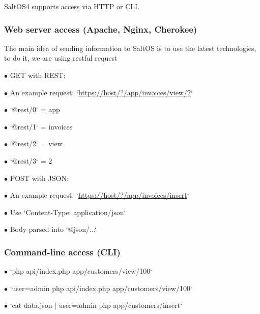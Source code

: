 \documentclass[a4paper]{article}
\def\htmladdnormallink#1#2{\href{#2}{#1}}
\begin{document}
SaltOS4 supports access via HTTP or CLI.

\hypertarget{toc13}{}
\subsubsection{Web server access (Apache, Nginx, Cherokee)}

The main idea of sending information to SaltOS is to use the latest technologies, to do it, we are using restful request

\begin{compactitem}
\item[\color{myblue}$\bullet$] GET with REST:
  \begin{compactitem}
  \item[\color{myblue}$\bullet$] An example request: `\htmladdnormallink{https://host/?/app/invoices/view/2}{https://host/?/app/invoices/view/2}`
  \item[\color{myblue}$\bullet$] `@rest/0` = app
  \item[\color{myblue}$\bullet$] `@rest/1` = invoices
  \item[\color{myblue}$\bullet$] `@rest/2` = view
  \item[\color{myblue}$\bullet$] `@rest/3` = 2
  \end{compactitem}
\item[\color{myblue}$\bullet$] POST with JSON:
  \begin{compactitem}
  \item[\color{myblue}$\bullet$] An example request: `\htmladdnormallink{https://host/?/app/invoices/insert}{https://host/?/app/invoices/insert}`
  \item[\color{myblue}$\bullet$] Use `Content-Type: application/json`
  \item[\color{myblue}$\bullet$] Body parsed into `@json/...`
  \end{compactitem}
\end{compactitem}

\hypertarget{toc14}{}
\subsubsection{Command-line access (CLI)}

\begin{compactitem}
\item[\color{myblue}$\bullet$] `php api/index.php app/customers/view/100`
\item[\color{myblue}$\bullet$] `user=admin php api/index.php app/customers/view/100`
\item[\color{myblue}$\bullet$] `cat data.json $|$ user=admin php app/customers/insert`
\end{compactitem}
\end{document}
